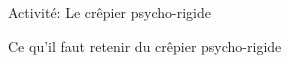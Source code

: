 \documentclass[final,hyperref={pdfpagelabels=false}]{beamer}
\begin{document}
\begin{frame}{Activité: Le crêpier psycho-rigide}
  
\end{frame}
\begin{frame}{Ce qu'il faut retenir du  crêpier psycho-rigide}
  
\end{frame}
\end{document}
